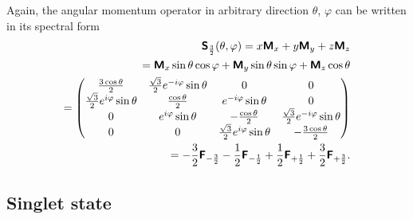 Again, the angular momentum operator in arbitrary direction $\theta$, $\varphi$ can be written in its spectral form
\begin{equation}
\begin{split}
\textsf{\textbf{S}}_\frac{3}{2} (\theta ,\varphi) =
x\textsf{\textbf{M}}_x
+
y\textsf{\textbf{M}}_y
+
z\textsf{\textbf{M}}_z  \\
=
 \textsf{\textbf{M}}_x  \sin \theta \cos \varphi
+
\textsf{\textbf{M}}_y   \sin \theta \sin \varphi
+
\textsf{\textbf{M}}_z   \cos \theta
\\
=\begin{pmatrix}
 \frac{3 \cos \theta }{2} & \frac{\sqrt{3}}{2}  e^{-i \varphi } \sin \theta  & 0 & 0 \\
 \frac{\sqrt{3}}{2}  e^{i \varphi } \sin \theta  & \frac{\cos \theta }{2} & e^{-i \varphi } \sin \theta  & 0 \\
 0 & e^{i \varphi } \sin \theta  & -\frac{\cos \theta }{2} & \frac{\sqrt{3}}{2}  e^{-i \varphi } \sin \theta  \\
 0 & 0 & \frac{ \sqrt{3}}{2} e^{i \varphi } \sin \theta  & -\frac{3 \cos \theta }{2}
\end{pmatrix}
 \\
= -\frac{3}{2}\textsf{\textbf{F}}_{-\frac{3}{2}}  - \frac{1}{2} \textsf{\textbf{F}}_{-\frac{1}{2}} +
\frac{1}{2}\textsf{\textbf{F}}_{+\frac{1}{2}} + \frac{3}{2}\textsf{\textbf{F}}_{+\frac{3}{2}}.
\end{split}
\label{e-2009-gtq-s444}
\end{equation}



\subsection{Singlet state}

